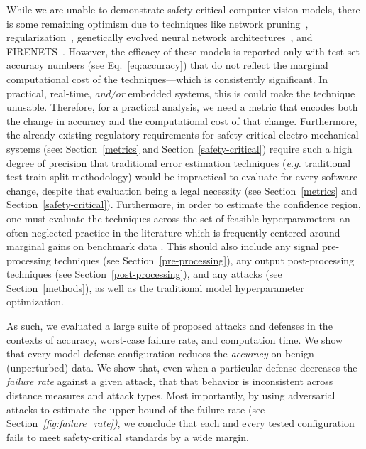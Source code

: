 \documentclass[journal]{IEEEtran}
\newcommand{\eg}{\textit{e.g.}\xspace}
\newcommand{\cm}[1]{\textit{{\color{blue}#1}}}
\begin{document}
While we are unable to demonstrate safety-critical computer vision models, there is some remaining optimism due to techniques like network pruning~\cite{sehwag2019towards, cosentino2019search, jian2022pruning}, regularization~\cite{ross2018improving, jakubovitz2018improving}, genetically evolved neural network architectures~\cite{sinn2019evolutionary}, and FIRENETS~\cite{colbrook2021can}. However, the efficacy of these models is reported only with test-set accuracy numbers (see Eq.~\ref{eq:accuracy}) that do not reflect the marginal computational cost of the techniques---which is consistently significant. In practical, real-time, \cm{and/or} embedded systems, this is could make the technique unusable. Therefore, for a practical analysis, we need a metric that encodes both the change in accuracy and the computational cost of that change. Furthermore, the already-existing regulatory requirements for safety-critical electro-mechanical systems (see: Section~\ref{metrics} and Section~\ref{safety-critical}) require such a high degree of precision that traditional error estimation techniques (\eg traditional test-train split methodology) would be impractical to evaluate for every software change, despite that evaluation being a legal necessity (see Section~\ref{metrics} and Section~\ref{safety-critical}). Furthermore, in order to estimate the confidence region, one must evaluate the techniques across the set of feasible hyperparameters--an often neglected practice in the literature which is frequently centered around marginal gains on benchmark data \cite{desislavov2021compute}. 
This should also include any signal pre-processing techniques (see Section~\ref{pre-processing}), any output post-processing techniques (see Section~\ref{post-processing}), and any attacks (see Section~\ref{methods}), as well as the traditional model hyperparameter optimization.

As such, we evaluated a large suite of proposed attacks and defenses in the contexts of accuracy, worst-case failure rate, and computation time. We show that every model defense configuration reduces the \textit{accuracy} on benign (unperturbed) data. We show that, even when a particular defense decreases the \textit{failure rate} against a given attack, that that behavior is inconsistent across distance measures and attack types. Most importantly, by using adversarial attacks to estimate the upper bound of the failure rate (see Section~\cm{\ref{fig:failure_rate})}, we conclude that each and every tested configuration fails to meet safety-critical standards by a wide margin.
\end{document}
